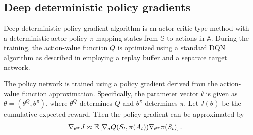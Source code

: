 \documentclass[a4paper,12pt]{amsart}
\newcommand{\stateSpace}{\mathbb S}
\newcommand{\actionSpace}{\mathbb A}
\newcommand{\stateValueFunc}{V}
\newcommand{\advantageFunc}{A}
\newcommand{\policy}{\pi}
\begin{document}
%
%
%
%

\subsection{Deep deterministic policy gradients}

Deep deterministic policy gradient algorithm is an actor-critic type method
with a deterministic actor policy $\pi$ mapping states from $\stateSpace$ to
actions in $\actionSpace$. During the training, the action-value
function $Q$ is optimized using a standard DQN algorithm as described in
\cite{mnih2015humanlevel} employing a replay buffer and a separate target
network.

The policy network is trained using a policy gradient derived from the action-value
function approximation. Specifically, the parameter vector $\theta$ is given as
$\theta = (\theta^{Q}, \theta^{\pi})$, where $\theta^{Q}$ determines $Q$ and
$\theta^{\pi}$ determines $\pi$. Let $J(\theta)$ be the cumulative expected 
reward. Then the policy gradient can be approximated by
\begin{align*}
    \nabla_{\theta^{\pi}} J & \approx
    \mathbb{E} \left[ \nabla_{a} Q(S_t, \pi(A_t)) \nabla_{\theta^\pi} \pi(S_t) \right].
\end{align*}
\end{document}
